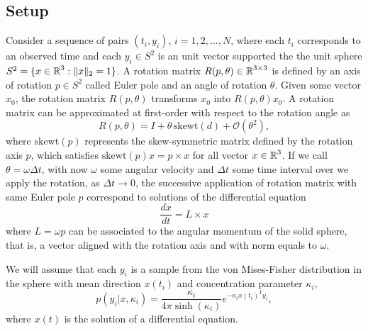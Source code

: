 \subsection{Setup}

Consider a sequence of pairs $(t_i, y_i)$, $i=1, 2, \ldots, N$, where each $t_i$ corresponds to an observed time and each $y_i \in S^2$ is an unit vector supported the the unit sphere $S^2 = \{ x \in \operatorname{\mathbb{R}}^3 : \| x \|_2 = 1 \}$. 
A rotation matrix $R(p, \theta) \in \operatorname{\mathbb{R}}^{3 \times 3}$ is defined by an axis of rotation $p \in S^2$ called Euler pole and an angle of rotation $\theta$.
Given some vector $x_0$, the rotation matrix $R(p, \theta)$ transforms $x_0$ into $R(p, \theta) x_0$.
A rotation matrix can be approximated at first-order with respect to the rotation angle as
\begin{equation}
    R(p, \theta) 
    = 
    I + \theta \, \text{skewt}(d) + \mathcal O (\theta^2 ),
\end{equation}
where $ \text{skewt}(p)$ represents the skew-symmetric matrix defined by the rotation axis $p$, which satisfies $\text{skewt}(p)  x =p \times x$ for all vector $x \in \operatorname{\mathbb{R}}^3$. 
If we call $\theta = \omega \Delta t$, with now $\omega$ some angular velocity and $\Delta t$ some time interval over we apply the rotation, as $\Delta t \rightarrow 0$, the successive application of rotation matrix with same Euler pole $p$ correspond to solutions of the differential equation 
\begin{equation}
    \frac{dx}{dt} 
    = 
    L \times x %
\end{equation}
where $L = \omega p$ can be associated to the angular momentum of the solid sphere, that is, a vector aligned with the rotation axis and with norm equals to $\omega$. 

We will assume that each $y_i$ is a sample from the von Mises-Fisher distribution \cite{fisher1953dispersion, Watson_1982} in the sphere with mean direction $x(t_i)$ and concentration parameter $\kappa_i$, 
\begin{equation}
    p(y_i | x, \kappa_i)
    = 
    \frac{\kappa_i}{4 \pi \sinh (\kappa_i)} e^{- \kappa_i x(t_i)^T y_i},
\end{equation}
where $x(t)$ is the solution of a differential equation. 



